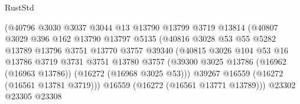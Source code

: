 \begin{lexlean}{RustStd}
\begin{coremodule}
                                      (@40796
                                        @3030
                                        @3037
                                        @3044
                                        @13
                                        @13790
                                        @13799
                                        @3719
                                        @13814
                                        (@40807
                                          @3029
                                          @396
                                          @162
                                          @13790
                                          @13797
                                          @5135
                                          (@40816
                                            @3028
                                            @53
                                            @55
                                            @5282
                                            @13789
                                            @13796
                                            @3751
                                            @13770
                                            @3757
                                            @39340
                                            (@40815
                                              @3026
                                              @104
                                              @53
                                              @16
                                              @13786
                                              @3719
                                              @3731
                                              @3751
                                              @13780
                                              @3757
                                              (@39300
                                                @3025
                                                @13786
                                                (@16962 (@16963 @13786))
                                                (@16272 (@16968 @3025 @53)))
                                              @39267
                                              @16559
                                              (@16272 (@16561 @13781 @3719)))
                                            @16559
                                            (@16272 (@16561 @13771 @13789)))
                                          @23302
                                          @23305
                                          @23308

\end{coremodule}
\end{lexlean}
